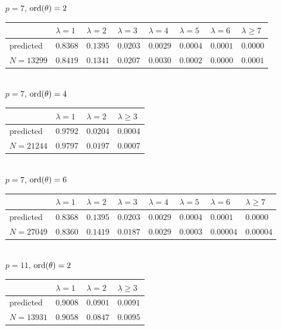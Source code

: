 \documentclass[pdflatex,sn-mathphys-num]{sn-jnl}%
\theoremstyle{plain}
\theoremstyle{definition}
\theoremstyle{remark}
\numberwithin{equation}{section}
\newcommand{\ord}{\text{\rm ord}}
\begin{document}
\noindent $p=7$, $\ord(\theta)=2$\\
\begin{tabular}{|l|l|l|l|l|l|l|l|} \hline
& $\lambda=1$ & $\lambda=2$ & $\lambda=3$ & $\lambda=4$ & $\lambda=5$ & $\lambda=6$ & $\lambda\geq 7$ \\ \hline
predicted & $0.8368$ & $0.1395$ &  $0.0203$ &  $0.0029$ &  $0.0004$ &  $0.0001$ & $0.0000$ \\ \hline
$N=13299$ & $0.8419$ & $0.1341$ & $0.0207$ & $0.0030$ & $0.0002$ & $0.0000$ & $0.0001$\\ \hline
\end{tabular}\\



\noindent $p=7$, $\ord(\theta)=4$\\
\begin{tabular}{|l|l|l|l|} \hline
& $\lambda=1$ & $\lambda=2$ & $\lambda \geq 3$ \\ \hline
predicted & $0.9792$ & $0.0204$ & $0.0004$ \\ \hline
 $N=21244$ & $0.9797$ & $0.0197$ & $0.0007$ \\ \hline
\end{tabular}\\



\noindent $p=7$, $\ord(\theta)=6$\\
\begin{tabular}{|l|l|l|l|l|l|l|l|} \hline
& $\lambda=1$ & $\lambda=2$ & $\lambda=3$ & $\lambda=4$ & $\lambda=5$ & $\lambda=6$ & $\lambda\geq 7$ \\ \hline
predicted & $0.8368$ & $0.1395$ &  $0.0203$ &  $0.0029$ &  $0.0004$ &  $0.0001$ & $0.0000$ \\ \hline
$N=27049$ & $0.8360$ & $0.1419$ & $0.0187$ & $0.0029$ & $0.0003$ & $0.00004$ & $0.00004$\\ \hline
\end{tabular}\\



\noindent $p=11$, $\ord(\theta)=2$\\
\begin{tabular}{|l|l|l|l|} \hline
 & $\lambda=1$ & $\lambda=2$ & $\lambda \geq 3$ \\ \hline
predicted & $0.9008$ & $0.0901$ & $0.0091$ \\ \hline
$N=13931$ & $0.9058$ & $0.0847$ & $0.0095$ \\ \hline

\end{tabular}\\
\end{document}
